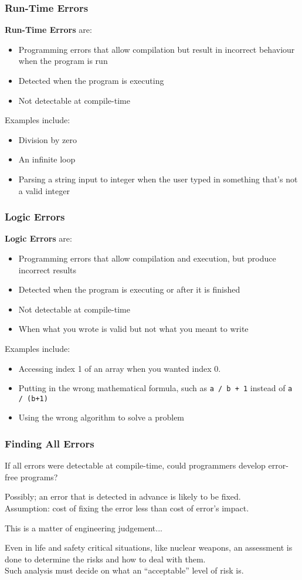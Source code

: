 \begin{frame}
\frametitle{Run-Time Errors}
\textbf{Run-Time Errors} are:
\begin{itemize}
	\item Programming errors that allow compilation but result in incorrect behaviour when the program is run
	\item Detected when the program is executing
	\item Not detectable at compile-time
\end{itemize}

Examples include:
		\begin{itemize}
			\item Division by zero
			\item An infinite loop
			\item Parsing a string input to integer when the user typed in something that's not a valid integer
		\end{itemize}

\end{frame}

\begin{frame}
\frametitle{Logic Errors}
\textbf{Logic Errors} are:
\begin{itemize}
	\item Programming errors that allow compilation and execution, but produce incorrect results
	\item Detected when the program is executing or after it is finished
	\item Not detectable at compile-time
	\item When what you wrote is valid but not what you meant to write
\end{itemize}

Examples include:
		\begin{itemize}
			\item Accessing index 1 of an array when you wanted index 0.
			\item Putting in the wrong mathematical formula, such as \texttt{a / b + 1} instead of \texttt{a / (b+1)}
			\item Using the wrong algorithm to solve a problem
		\end{itemize}

\end{frame}


\begin{frame}
\frametitle{Finding All Errors}
If all errors were detectable at compile-time, could programmers develop error-free programs?

Possibly; an error that is detected in advance is likely to be fixed.\\
\quad Assumption: cost of fixing the error less than cost of error's impact.


This is a matter of engineering judgement...

Even in life and safety critical situations, like nuclear weapons, an assessment is done to determine the risks and how to deal with them.\\
\quad Such analysis must decide on what an ``acceptable'' level of risk is.

\end{frame}

